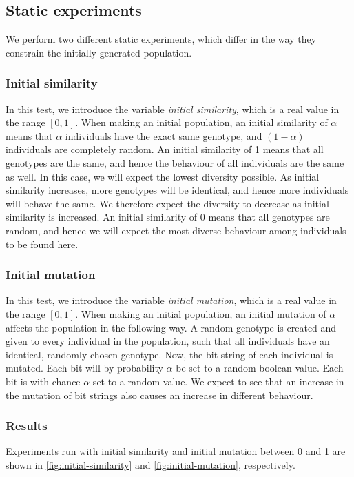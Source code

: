 \subsection{Static experiments}
We perform two different static experiments, which differ in the way they constrain the initially generated population. 

\subsubsection{Initial similarity}
In this test, we introduce the variable \emph{initial similarity}, which is a real value in the range $[0,1]$.
When making an initial population, an initial similarity of $\alpha$ means that $\alpha$ individuals have the exact same genotype, and $(1-\alpha)$ individuals are completely random.
An initial similarity of \num{1} means that all genotypes are the same, and hence the behaviour of all individuals are the same as well. In this case, we will expect the lowest diversity possible.
As initial similarity increases, more genotypes will be identical, and hence more individuals will behave the same.
We therefore expect the diversity to decrease as initial similarity is increased.
An initial similarity of \num{0} means that all genotypes are random, and hence we will expect the most diverse behaviour among individuals to be found here.

\subsubsection{Initial mutation}
In this test, we introduce the variable \emph{initial mutation}, which is a real value in the range $[0,1]$.
When making an initial population, an initial mutation of $\alpha$ affects the population in the following way.
A random genotype is created and given to every individual in the population, such that all individuals have an identical, randomly chosen genotype.
Now, the bit string of each individual is mutated. Each bit will by probability $\alpha$ be set to a random boolean value. 
Each bit is with chance $\alpha$ set to a random value.
We expect to see that an increase in the mutation of bit strings also causes an increase in different behaviour. 

\subsubsection{Results}
Experiments run with initial similarity and initial mutation between 0 and 1 are shown in \cref{fig:initial-similarity} and \cref{fig:initial-mutation}, respectively.


